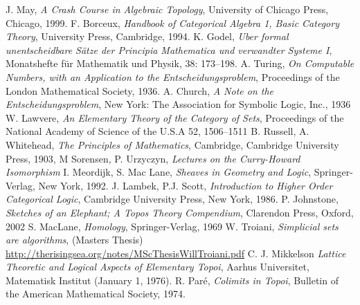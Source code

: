 \documentclass{birkjour}
\theoremstyle{plain}
\theoremstyle{definition}
\begin{document}
	\begin{thebibliography}{99}
	 J. May, \emph{A Crash Course in Algebraic Topology}, University of Chicago Press, Chicago, 1999.
	 F. Borceux, \emph{Handbook of Categorical Algebra 1, Basic Category Theory}, University Press, Cambridge, 1994.
	 K. Godel, \emph{Uber formal unentscheidbare Sätze der Principia Mathematica und verwandter Systeme I}, Monatshefte für Mathematik und Physik, 38: 173–198.
	 A. Turing, \emph{On Computable Numbers, with an Application to the Entscheidungsproblem}, Proceedings of the London Mathematical Society, 1936.
	 A. Church, \emph{A Note on the Entscheidungsproblem}, New York: The Association for Symbolic Logic, Inc., 1936
	 W. Lawvere, \emph{An Elementary Theory of the Category of Sets}, Proceedings of
	the National Academy of Science of the U.S.A 52, 1506–1511
	 B. Russell, A. Whitehead, \emph{The Principles of Mathematics}, Cambridge, Cambridge University Press, 1903,
	 M Sorensen, P. Urzyczyn, \emph{Lectures on the Curry-Howard Isomorphism}
	 I. Meordijk, S. Mac Lane, \emph{Sheaves in Geometry and Logic}, Springer-Verlag, New York, 1992.
	 J. Lambek, P.J. Scott, \emph{Introduction to Higher Order Categorical Logic}, Cambridge University Press, New York, 1986.
	 P. Johnstone, \emph{Sketches of an Elephant; A Topos Theory Compendium}, Clarendon Press, Oxford, 2002
	 S. MacLane, \emph{Homology}, Springer-Verlag, 1969
	 W. Troiani, \emph{Simplicial sets are algorithms}, (Masters Thesis) \url{http://therisingsea.org/notes/MScThesisWillTroiani.pdf}
	 C. J. Mikkelson \emph{Lattice Theoretic and Logical Aspects of Elementary Topoi}, Aarhus Universitet, Matematisk Institut (January 1, 1976).
	 R. Paré, \emph{Colimits in Topoi}, Bulletin of the American Mathematical Society, 1974.
	
	\end{thebibliography}
\end{document}
